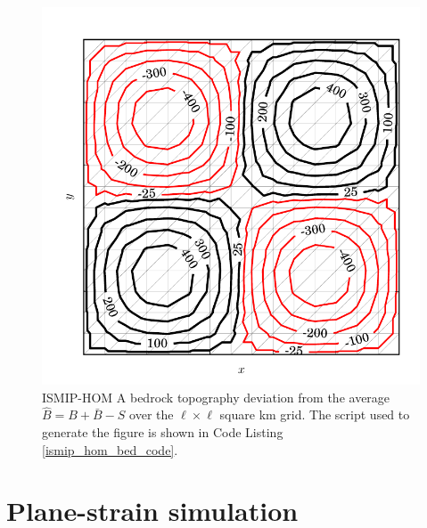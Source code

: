 \begin{figure}
  \centering
    \includegraphics[width=\linewidth]{images/momentum/ISMIP_HOM_A/B.pdf}
  \caption[ISMIP-HOM bedrock topography]{ISMIP-HOM A bedrock topography deviation from the average $\hat{B} = B + \bar{B} - S$ over the $\ell \times \ell$ square km grid.  The \CSLVR script used to generate the figure is shown in Code Listing \ref{ismip_hom_bed_code}.}
  \label{ismip_hom_a_B}
\end{figure}

\section{Plane-strain simulation} \label{ssn_plane_strain_simulation}


